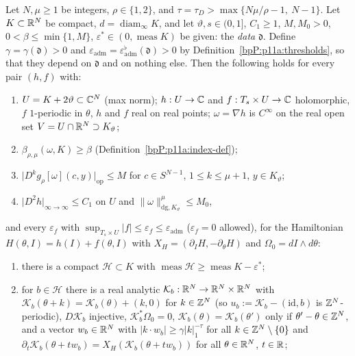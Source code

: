 \begin{theorem}\label{bpP:p11a:weak-kam-quantitative}
Let $N,\mu\ge1$ be integers, $\rho\in\{1,2\}$, and $\tau=\tau_D>\max\{N\mu/\rho-1,\ N-1\}$. Let $K\subset\mathbb{R}^N$ be compact, $d=\operatorname{diam}_\infty K$, and let $\vartheta,s\in(0,1]$, $C_1\ge1$, $M,M_0>0$, $0<\beta\le\min\{1,M\}$, $\varepsilon^*\in(0,\operatorname{meas}K)$ be given: the \emph{data} $\mathfrak d$. Define $\gamma=\gamma(\mathfrak d)>0$ and $\varepsilon_{\mathrm{adm}}=\varepsilon^\flat_{\mathrm{adm}}(\mathfrak d)>0$ by Definition~\ref{bpP:p11a:thresholds}, so that they depend on $\mathfrak d$ and on nothing else. Then the following holds for every pair $(h,f)$ with:
\begin{enumerate}[label=(A\arabic*)]
\item $U=K+2\vartheta\subset\mathbb{C}^N$ (max norm); $h:U\to\mathbb{C}$ and $f:T_s\times U\to\mathbb{C}$ holomorphic, $f$ $1$-periodic in $\theta$, $h$ and $f$ real on real points; $\omega=\nabla h$ is $C^\infty$ on the real open set $V=U\cap\mathbb{R}^N\supset K_\vartheta$;
\item $\beta_{\rho,\mu}(\omega,K)\ge\beta$ (Definition~\ref{bpP:p11a:index-def});
\item $\lvert D^kg_\rho[\omega](c,y)\rvert_{\mathrm{op}}\le M$ for $c\in S^{N-1}$, $1\le k\le\mu+1$, $y\in K_\vartheta$;
\item $\lvert D^2h\rvert_{\infty\to\infty}\le C_1$ on $U$ and $\lVert\omega\rVert^\mu_{\mathrm{dg},K_\vartheta}\le M_0$,
\end{enumerate}
and every $\varepsilon_f$ with $\sup_{T_s\times U}\lvert f\rvert\le\varepsilon_f\le\varepsilon_{\mathrm{adm}}$ ($\varepsilon_f=0$ allowed), for the Hamiltonian $H(\theta,I)=h(I)+f(\theta,I)$ with $X_H=(\partial_IH,-\partial_\theta H)$ and $\Omega_0=dI\wedge d\theta$:
\begin{enumerate}[label=(K\arabic*)]
\item there is a compact $\mathcal H\subset K$ with $\operatorname{meas}\mathcal H\ge\operatorname{meas}K-\varepsilon^*$;
\item for $b\in\mathcal H$ there is a real analytic $\mathcal K_b:\mathbb{R}^N\to\mathbb{R}^N\times\mathbb{R}^N$ with $\mathcal K_b(\theta+k)=\mathcal K_b(\theta)+(k,0)$ for $k\in\mathbb{Z}^N$ (so $u_b:=\mathcal K_b-(\mathrm{id},b)$ is $\mathbb{Z}^N$-periodic), $D\mathcal K_b$ injective, $\mathcal K_b^*\Omega_0=0$, $\mathcal K_b(\theta)=\mathcal K_b(\theta')$ only if $\theta'-\theta\in\mathbb{Z}^N$, and a vector $w_b\in\mathbb{R}^N$ with $\lvert k\cdot w_b\rvert\ge\gamma\lvert k\rvert_1^{-\tau}$ for all $k\in\mathbb{Z}^N\setminus\{0\}$ and $\partial_t\mathcal K_b(\theta+tw_b)=X_H(\mathcal K_b(\theta+tw_b))$ for all $\theta\in\mathbb{R}^N$, $t\in\mathbb{R}$;

\end{enumerate}
\end{theorem}
